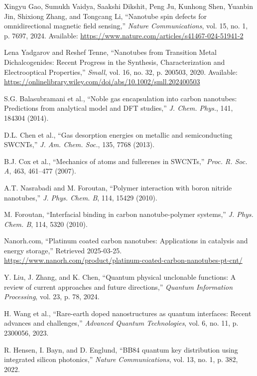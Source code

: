 \documentclass[11pt]{article}
\begin{document}
	\begin{thebibliography}{99}
		
		Xingyu Gao, Sumukh Vaidya, Saakshi Dikshit, Peng Ju, Kunhong Shen, Yuanbin Jin, Shixiong Zhang, and Tongcang Li, ``Nanotube spin defects for omnidirectional magnetic field sensing,'' \textit{Nature Communications}, vol. 15, no. 1, p. 7697, 2024. Available: \url{https://www.nature.com/articles/s41467-024-51941-2}
		
		Lena Yadgarov and Reshef Tenne, ``Nanotubes from Transition Metal Dichalcogenides: Recent Progress in the Synthesis, Characterization and Electrooptical Properties,'' \textit{Small}, vol. 16, no. 32, p. 200503, 2020. Available: \url{https://onlinelibrary.wiley.com/doi/abs/10.1002/smll.202400503}
		
		S.G. Balasubramani et al., ``Noble gas encapsulation into carbon nanotubes: Predictions from analytical model and DFT studies,'' \textit{J. Chem. Phys.}, 141, 184304 (2014).
		
		D.L. Chen et al., ``Gas desorption energies on metallic and semiconducting SWCNTs,'' \textit{J. Am. Chem. Soc.}, 135, 7768 (2013).
		
		B.J. Cox et al., ``Mechanics of atoms and fullerenes in SWCNTs,'' \textit{Proc. R. Soc. A}, 463, 461--477 (2007).
		
		A.T. Nasrabadi and M. Foroutan, ``Polymer interaction with boron nitride nanotubes,'' \textit{J. Phys. Chem. B}, 114, 15429 (2010).
		
		M. Foroutan, ``Interfacial binding in carbon nanotube-polymer systems,'' \textit{J. Phys. Chem. B}, 114, 5320 (2010).
		
		Nanorh.com, ``Platinum coated carbon nanotubes: Applications in catalysis and energy storage,'' Retrieved 2025-03-25. \url{https://www.nanorh.com/product/platinum-coated-carbon-nanotubes-pt-cnt/}
		
		Y. Liu, J. Zhang, and K. Chen, ``Quantum physical unclonable functions: A review of current approaches and future directions,'' \textit{Quantum Information Processing}, vol. 23, p. 78, 2024.
		
		H. Wang et al., ``Rare-earth doped nanostructures as quantum interfaces: Recent advances and challenges,'' \textit{Advanced Quantum Technologies}, vol. 6, no. 11, p. 2300056, 2023.
		
		R. Hensen, I. Bayn, and D. Englund, ``BB84 quantum key distribution using integrated silicon photonics,'' \textit{Nature Communications}, vol. 13, no. 1, p. 382, 2022.
		
	\end{thebibliography}
	
\end{document}
